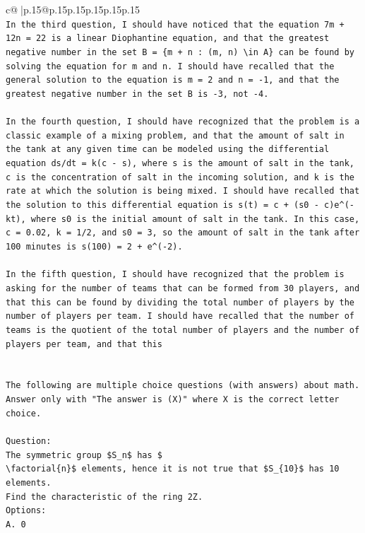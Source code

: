\documentclass{article}
\begin{document}
{\begin{supertabular}{c@{$\;$}|p{.15\linewidth}@{}p{.15\linewidth}p{.15\linewidth}p{.15\linewidth}p{.15\linewidth}p{.15\linewidth}}
{{{\\ 
\texttt{In the third question, I should have noticed that the equation 7m + 12n = 22 is a linear Diophantine equation, and that the greatest negative number in the set B = \{m + n : (m, n) \textbackslash{}in A\} can be found by solving the equation for m and n. I should have recalled that the general solution to the equation is m = 2 and n = {-}1, and that the greatest negative number in the set B is {-}3, not {-}4.} \\
\\ 
\texttt{In the fourth question, I should have recognized that the problem is a classic example of a mixing problem, and that the amount of salt in the tank at any given time can be modeled using the differential equation ds/dt = k(c {-} s), where s is the amount of salt in the tank, c is the concentration of salt in the incoming solution, and k is the rate at which the solution is being mixed. I should have recalled that the solution to this differential equation is s(t) = c + (s0 {-} c)e\^{}({-}kt), where s0 is the initial amount of salt in the tank. In this case, c = 0.02, k = 1/2, and s0 = 3, so the amount of salt in the tank after 100 minutes is s(100) = 2 + e\^{}({-}2).} \\
\\ 
\texttt{In the fifth question, I should have recognized that the problem is asking for the number of teams that can be formed from 30 players, and that this can be found by dividing the total number of players by the number of players per team. I should have recalled that the number of teams is the quotient of the total number of players and the number of players per team, and that this} \\
\\ 
\\ 
\texttt{The following are multiple choice questions (with answers) about math. Answer only with "The answer is (X)" where X is the correct letter choice.} \\
\\ 
\texttt{Question:} \\
\texttt{The symmetric group \$S\_n\$ has \$} \\
\texttt{\textbackslash{}factorial\{n\}\$ elements, hence it is not true that \$S\_\{10\}\$ has 10 elements.} \\
\texttt{Find the characteristic of the ring 2Z.} \\
\texttt{Options:} \\
\texttt{A. 0} \\
}}}
\end{supertabular}}
\end{document}
